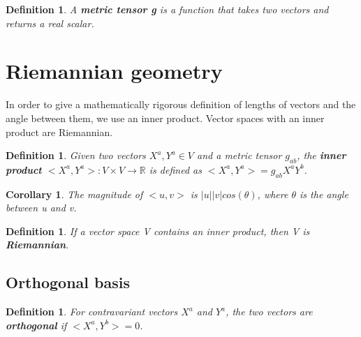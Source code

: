 \documentclass{book}
\newtheorem{defn}[equation]{Definition}
\newtheorem{coro}[equation]{Corollary}
\begin{document}
\begin{defn}
	A \textbf{metric tensor g} is a function that takes two vectors and returns a real scalar. 
\end{defn}


\section{Riemannian geometry}
In order to give a mathematically rigorous definition of lengths of vectors and the angle between them, we use an inner product. Vector spaces with an inner product are Riemannian.

\begin{defn}
	Given two vectors $X^a,Y^a \in V$ and a metric tensor $g_{ab}$, the \textbf{inner product} $<X^a,Y^a> : V \times V \to \mathbb{R}$ is defined as $<X^a,Y^a> = g_{ab}X^aY^b$. 
\end{defn}

\begin{coro}
	The magnitude of $<u,v>$ is $|u||v|cos(\theta)$, where $\theta$ is the angle between u and v. 
\end{coro}

\begin{defn}
	If a vector space V contains an inner product, then V is \textbf{Riemannian}.
	\end{defn}



\subsection{Orthogonal basis}

\begin{defn}
	For contravariant vectors $X^a$ and $Y^a$, the two vectors are \textbf{orthogonal} if $<X^a,Y^b> = 0$. 
\end{defn}
\end{document}
